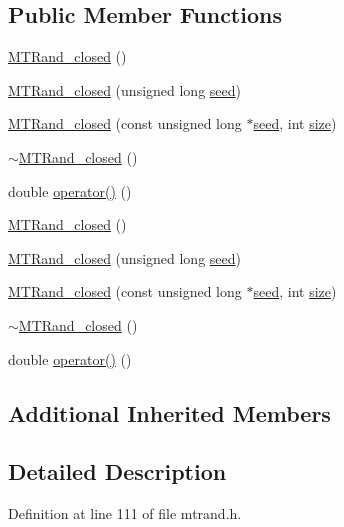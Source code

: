 \subsection*{Public Member Functions}
\begin{DoxyCompactItemize}
\item 
\hyperlink{a00017_a09b3b21b3cb35d04f2b6c290a817b2e8}{M\+T\+Rand\+\_\+closed} ()
\item 
\hyperlink{a00017_ad5dc83250b16f22d4693a18b51816271}{M\+T\+Rand\+\_\+closed} (unsigned long \hyperlink{a00018_a0c57076fe30358e0700a7ce1baa0ea27}{seed})
\item 
\hyperlink{a00017_a37e322f97253b7013823a267bcfe82d1}{M\+T\+Rand\+\_\+closed} (const unsigned long $\ast$\hyperlink{a00018_a0c57076fe30358e0700a7ce1baa0ea27}{seed}, int \hyperlink{a00104_ae113ea7f9e515a12ac4b5595c6faf61e}{size})
\item 
\hyperlink{a00017_a46567ee841b5f54b305ac051ac837a8c}{$\sim$\+M\+T\+Rand\+\_\+closed} ()
\item 
double \hyperlink{a00017_ad0c535263b63c95029523183f672f62d}{operator()} ()
\item 
\hyperlink{a00017_a09b3b21b3cb35d04f2b6c290a817b2e8}{M\+T\+Rand\+\_\+closed} ()
\item 
\hyperlink{a00017_ad5dc83250b16f22d4693a18b51816271}{M\+T\+Rand\+\_\+closed} (unsigned long \hyperlink{a00018_a0c57076fe30358e0700a7ce1baa0ea27}{seed})
\item 
\hyperlink{a00017_a37e322f97253b7013823a267bcfe82d1}{M\+T\+Rand\+\_\+closed} (const unsigned long $\ast$\hyperlink{a00018_a0c57076fe30358e0700a7ce1baa0ea27}{seed}, int \hyperlink{a00104_ae113ea7f9e515a12ac4b5595c6faf61e}{size})
\item 
\hyperlink{a00017_a46567ee841b5f54b305ac051ac837a8c}{$\sim$\+M\+T\+Rand\+\_\+closed} ()
\item 
double \hyperlink{a00017_ad0c535263b63c95029523183f672f62d}{operator()} ()
\end{DoxyCompactItemize}
\subsection*{Additional Inherited Members}


\subsection{Detailed Description}


Definition at line 111 of file mtrand.\+h.



